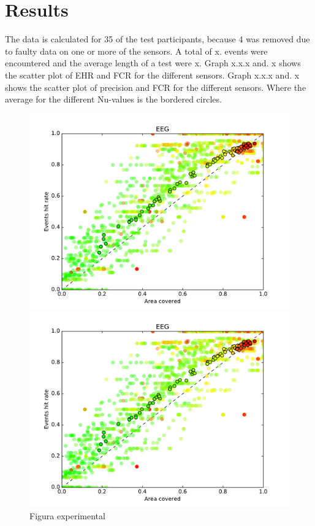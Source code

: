 \section{Results}
The data is calculated for 35 of the test participants, because 4 was removed due to faulty data on one or more of the sensors.	
A total of x. events were encountered and the average length of a test were x.
Graph x.x.x and. x shows the scatter plot of EHR and FCR for the different sensors. 
Graph x.x.x and. x shows the scatter plot of precision and FCR for the different sensors. Where the average for the different Nu-values is the bordered circles.

\begin{figure}[h!]
  \begin{minipage}[t]{0.5\textwidth}
    \includegraphics[width=\linewidth,keepaspectratio=true]{graphics/graphs/short/area_covered-events_hit_rate-CovNu-EEG.pdf}
    \caption{Figura experimental}
    \label{fase1}
  \end{minipage}
  \hspace*{\fill} %
  \begin{minipage}[t]{0.5\textwidth}
    \includegraphics[width=\linewidth,keepaspectratio=true]{graphics/graphs/short/area_covered-events_hit_rate-CovNu-EEG.pdf}

\end{minipage}
\end{figure}
